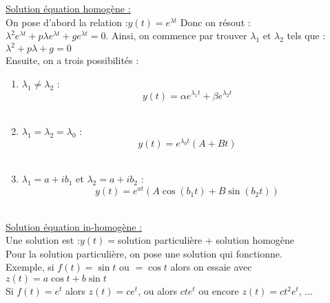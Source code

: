\documentclass[../main.tex]{subfiles}
\begin{document}
\underline{Solution équation homogène :}\\
On pose d'abord la relation :$y(t) = e^{\lambda t}$ Donc on résout : $\lambda^2 e^{\lambda t} + p\lambda e^{\lambda t} + ge^{\lambda t} = 0$. Ainsi, on commence par trouver $\lambda_1$ et $\lambda_2$ tels que :\\
$\lambda^2 +p\lambda + g =0$\\
Ensuite, on a trois possibilités :
\begin{enumerate}
    \item $\lambda_1 \neq \lambda_2$ :\\ \begin{equation}
        y(t) = \alpha e^{\lambda_1 t} + \beta e^{\lambda_2 t}
    \end{equation}\\
    \item $\lambda_1=\lambda_2 = \lambda_0$ : \\ \begin{equation}
        y(t) = e^{\lambda_0 t} (A+Bt)
    \end{equation}\\
    \item $\lambda_1 = a+ib_1$ et $\lambda_2 = a+ib_2$ : \\ \begin{equation}
        y(t) = e^{at} (A\cos(b_1t) + B\sin(b_2t))
    \end{equation}\\
\end{enumerate}
\underline{Solution équation in-homogène :}\\
Une solution est :$y(t) =$solution particulière + solution homogène\\
Pour la solution particulière, on pose une solution qui fonctionne.\\
Exemple, si $f(t) =\sin{t}$ ou $=\cos{t}$ alors on essaie avec $z(t) = a\cos{t}+b\sin{t}$\\
Si $f(t) = e^t$ alors $z(t) = ce^t$, ou alors $cte^t$ ou encore $z(t) = ct^2 e^t$, $\dots$
\end{document}
